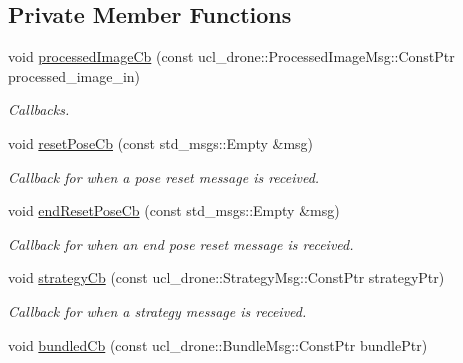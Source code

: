 \subsection*{Private Member Functions}
\begin{DoxyCompactItemize}
\item 
void \hyperlink{classMappingNode_aa5cfb0863500af4ec0dcb49b18b9f155}{processed\+Image\+Cb} (const ucl\+\_\+drone\+::\+Processed\+Image\+Msg\+::\+Const\+Ptr processed\+\_\+image\+\_\+in)
\begin{DoxyCompactList}\small\item\em Callbacks. \end{DoxyCompactList}\item 
\mbox{\label{classMappingNode_a01b2cd3fe9b949f9ae59d7261ae13eb5}} 
void \hyperlink{classMappingNode_a01b2cd3fe9b949f9ae59d7261ae13eb5}{reset\+Pose\+Cb} (const std\+\_\+msgs\+::\+Empty \&msg)
\begin{DoxyCompactList}\small\item\em Callback for when a pose reset message is received. \end{DoxyCompactList}\item 
\mbox{\label{classMappingNode_a60f20841c8125d6acca19ce6d6462b4c}} 
void \hyperlink{classMappingNode_a60f20841c8125d6acca19ce6d6462b4c}{end\+Reset\+Pose\+Cb} (const std\+\_\+msgs\+::\+Empty \&msg)
\begin{DoxyCompactList}\small\item\em Callback for when an end pose reset message is received. \end{DoxyCompactList}\item 
\mbox{\label{classMappingNode_ab67be9da4e7f72ba8b740d0f38409a5c}} 
void \hyperlink{classMappingNode_ab67be9da4e7f72ba8b740d0f38409a5c}{strategy\+Cb} (const ucl\+\_\+drone\+::\+Strategy\+Msg\+::\+Const\+Ptr strategy\+Ptr)
\begin{DoxyCompactList}\small\item\em Callback for when a strategy message is received. \end{DoxyCompactList}\item 
\mbox{\label{classMappingNode_a55e3043aee9d68444e8408e0028bec14}} 
void \hyperlink{classMappingNode_a55e3043aee9d68444e8408e0028bec14}{bundled\+Cb} (const ucl\+\_\+drone\+::\+Bundle\+Msg\+::\+Const\+Ptr bundle\+Ptr)

\end{DoxyCompactItemize}

